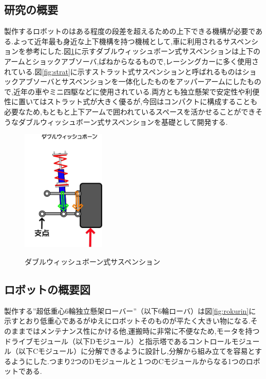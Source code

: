 \documentclass[a4paper]{jarticle}
\begin{document}
\subsection{研究の概要}
製作するロボットのはある程度の段差を超えるための上下できる機構が必要である.よって近年最も身近な上下機構を持つ機械として,車に利用されるサスペンションを参考にした.図\ref{fig:doublewish}に示すダブルウィッシュボーン式サスペンションは上下のアームとショックアブソーバ,ばねからなるもので,レーシングカーに多く使用されている.図\ref{fig:strat}に示すストラット式サスペンションと呼ばれるものはショックアブソーバとサスペンションを一体化したものをアッパーアームにしたもので,近年の車やミニ四駆などに使用されている.両方とも独立懸架で安定性や利便性に置いてはストラット式が大きく優るが,今回はコンパクトに構成することも必要なため,もともと上下アームで囲われているスペースを活かせることができそうなダブルウィッシュボーン式サスペンションを基礎として開発する.

\begin{figure}[htbt]
 \begin{center}
  \includegraphics[width=40mm]{img/doublewish.jpg}
 　\caption{ダブルウィッシュボーン式サスペンション}
  \label{fig:doublewish}%
 \end{center}
\end{figure}
\subsection{ロボットの概要図}

製作する”超低重心6輪独立懸架ローバー”（以下6輪ローバ）は図\ref{fig:rokurin}に示すとおり低重心であるがゆえにロボットそのものが平たく大きい物になる.そのままではメンテナンス性にかける他,運搬時に非常に不便なため,モータを持つドライブモジュール（以下Dモジュール）と指示塔であるコントロールモジュール（以下Cモジュール）に分解できるように設計し,分解から組み立てを容易とするようにした.つまり2つのDモジュールと１つのCモジュールからなる1つのロボットである.
\end{document}
